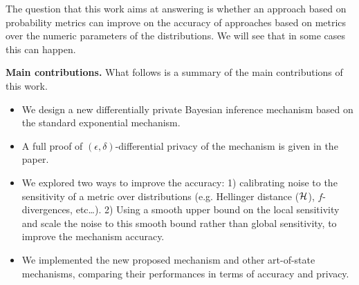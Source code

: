 \documentclass{article}
\begin{document}
The question that this work aims at answering is whether
an approach based on probability metrics can improve on
the accuracy of approaches based on metrics over
the numeric parameters of the distributions. 
We will see that in some cases this can happen.

\noindent \textbf{Main contributions.}
What follows is a summary of the main contributions of this work.
\begin{itemize}
	\item We design a new differentially private Bayesian inference mechanism based on the standard exponential mechanism.
    \item A full proof of $(\epsilon, \delta)$-differential privacy of the mechanism is given in the paper. 
	\item We explored two ways to improve the accuracy: 1) calibrating noise to the sensitivity of a metric over distributions
      (e.g. Hellinger distance ($\mathcal{H}$), $f$-divergences, etc\dots). 2) Using a smooth upper bound on the local sensitivity and scale
      the noise to this smooth bound rather than global sensitivity, to improve the mechanism accuracy.
  \item We implemented the new proposed mechanism and other art-of-state mechanisms, comparing their performances in terms of accuracy and privacy.
\end{itemize}
\end{document}
